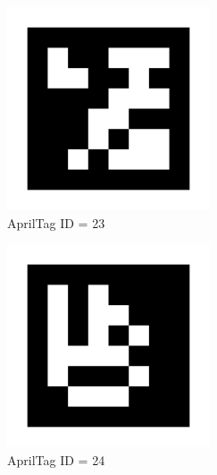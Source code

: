 \documentclass[1pt]{article}
\begin{document}
\clearpage
\begin{figure}[ht]
    \centering
    \includegraphics{AprilTag/tag31_11_00023.png}
    \caption{AprilTag ID = 23}
\end{figure}
\clearpage
\begin{figure}[ht]
    \centering
    \includegraphics{AprilTag/tag31_11_00024.png}
    \caption{AprilTag ID = 24}
\end{figure}
\end{document}
